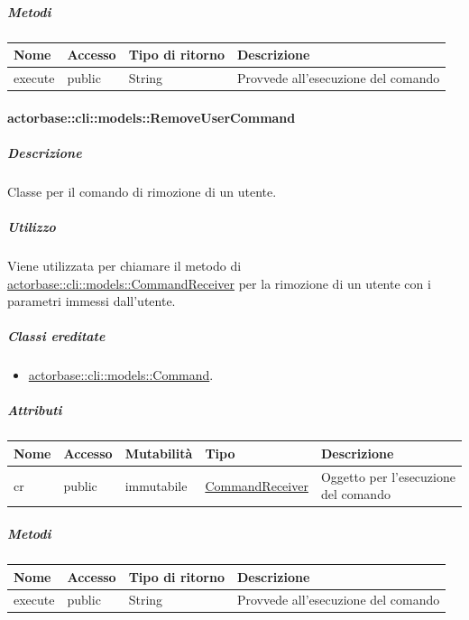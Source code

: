 \documentclass{scalatekids-article}
\begin{document}
\subparagraph{Metodi}

\begin{tabular}{| l | l | l | l |}
  \hline
  Nome & Accesso & Tipo di ritorno & Descrizione\\
  \hline
  execute & public & String & Provvede all'esecuzione del comando\\
  \hline
\end{tabular}

\paragraph{actorbase::cli::models::RemoveUserCommand}
\label{sec:actorbase::cli::models::RemoveUserCommand}

\subparagraph{Descrizione}

Classe per il comando di rimozione di un utente.

\subparagraph{Utilizzo}

Viene utilizzata per chiamare il metodo di
\hyperref[sec:actorbase::cli::models::CommandReceiver]{actorbase::cli::models::CommandReceiver} per la rimozione di un utente con i
parametri immessi dall'utente.

\subparagraph{Classi ereditate}

\begin{itemize}
\item \hyperref[sec:actorbase::cli::models::Command]{actorbase::cli::models::Command}.
\end{itemize}

\subparagraph{Attributi}

\begin{tabular}{| p{1cm} | p{1.5cm} | p{2cm} | p{4cm} | p{8.5cm} |}
  \hline
  Nome & Accesso & Mutabilità & Tipo & Descrizione\\
  \hline
  cr & public & immutabile & \hyperref[sec:actorbase::cli::models::CommandReceiver]{CommandReceiver} & Oggetto per l'esecuzione del comando\\
  \hline
\end{tabular}

\subparagraph{Metodi}

\begin{tabular}{| l | l | l | l |}
  \hline
  Nome & Accesso & Tipo di ritorno & Descrizione\\
  \hline
  execute & public & String & Provvede all'esecuzione del comando\\
  \hline
\end{tabular}
\end{document}
